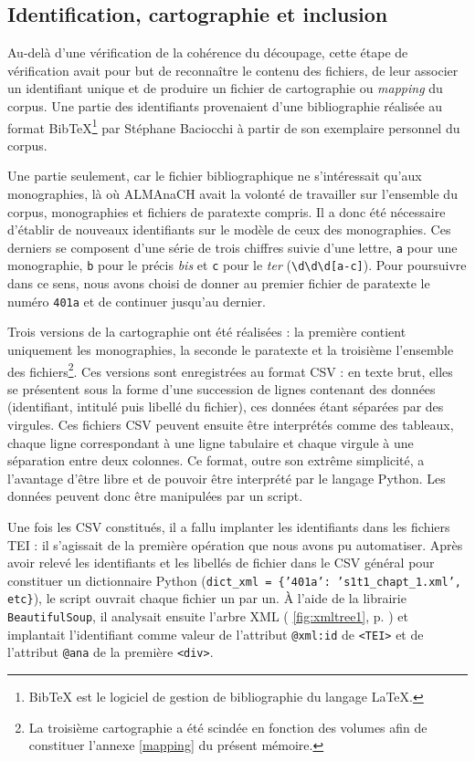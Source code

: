 \subsection{Identification, cartographie et inclusion}

Au-delà d'une vérification de la cohérence du découpage, cette étape de vérification avait pour but de reconnaître le contenu des fichiers, de leur associer un identifiant unique et de produire un fichier de cartographie ou \og \textit{mapping} \fg{} du corpus. Une partie des identifiants provenaient d'une bibliographie réalisée au format BibTeX\footnote{BibTeX est le logiciel de gestion de bibliographie du langage \LaTeX.} par Stéphane Baciocchi à partir de son exemplaire personnel du corpus.

Une partie seulement, car le fichier bibliographique ne s'intéressait qu'aux monographies, là où ALMAnaCH avait la volonté de travailler sur l'ensemble du corpus, monographies et fichiers de paratexte compris. Il a donc été nécessaire d'établir de nouveaux identifiants sur le modèle de ceux des monographies. Ces derniers se composent d'une série de trois chiffres suivie d'une lettre, \texttt{a} pour une monographie, \texttt{b} pour le précis \textit{bis} et \texttt{c} pour le \textit{ter} (\texttt{\textbackslash d\textbackslash d\textbackslash d[a-c]}). Pour poursuivre dans ce sens, nous avons choisi de donner au premier fichier de paratexte le numéro \texttt{401a} et de continuer jusqu'au dernier.

Trois versions de la cartographie ont été réalisées : la première contient uniquement les monographies, la seconde le paratexte et la troisième l'ensemble des fichiers\footnote{La troisième cartographie a été scindée en fonction des volumes afin de constituer l'annexe \ref{mapping} du présent mémoire.}. Ces versions sont enregistrées au format CSV : en texte brut, elles se présentent sous la forme d'une succession de lignes contenant des données (identifiant, intitulé puis libellé du fichier), ces données étant séparées par des virgules. Ces fichiers CSV peuvent ensuite être interprétés comme des tableaux, chaque ligne correspondant à une ligne tabulaire et chaque virgule à une séparation entre deux colonnes. Ce format, outre son extrême simplicité, a l'avantage d'être libre et de pouvoir être interprété par le langage Python. Les données peuvent donc être manipulées par un script.

Une fois les CSV constitués, il a fallu implanter les identifiants dans les fichiers TEI : il s'agissait de la première opération que nous avons pu automatiser. Après avoir relevé les identifiants et les libellés de fichier dans le CSV général pour constituer un dictionnaire Python (\texttt{dict\_xml = \{'401a': 's1t1\_chapt\_1.xml', etc\}}), le script ouvrait chaque fichier un par un. À l'aide de la librairie \texttt{BeautifulSoup}, il analysait ensuite l'arbre XML (\fig{} \ref{fig:xmltree1}, p. \pageref{fig:xmltree1}) et implantait l'identifiant comme valeur de l'attribut \texttt{@xml:id} de \texttt{<TEI>} et de l'attribut \texttt{@ana} de la première \texttt{<div>}.

